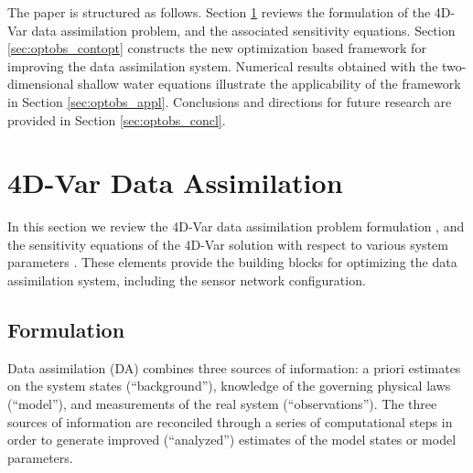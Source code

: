 \documentclass{article}
\begin{document}
The paper is structured as follows. Section \ref{sec:optobs_da} reviews the formulation 
of the 4D-Var data assimilation problem, and the associated sensitivity equations.
Section \ref{sec:optobs_contopt} constructs the new optimization based framework for improving the data assimilation system.
Numerical results obtained with the two-dimensional shallow water equations illustrate the applicability of the framework in Section \ref{sec:optobs_appl}. 
Conclusions and directions for future research are provided in Section \ref{sec:optobs_concl}.



\section{4D-Var Data Assimilation}\label{sec:optobs_da}


In this section we review the 4D-Var data assimilation problem formulation 
\cite{Daley,Kalnay_2002,cacuci1981sensitivity,Wang_1992,sandu2008discrete}, 
and the sensitivity equations of the 4D-Var solution
with respect to various system parameters \cite{Daescu_2008}.
These elements provide the building blocks for optimizing the data assimilation system,
including the sensor network configuration.

\subsection{Formulation}

Data assimilation (DA) combines three sources of information: a priori estimates on the system states (``background''),
knowledge of the governing physical laws (``model''), and measurements of the real system (``observations'').
The three sources of information are reconciled through a series of computational steps
in order to generate improved (``analyzed'') estimates of the model states or model parameters.
\end{document}

